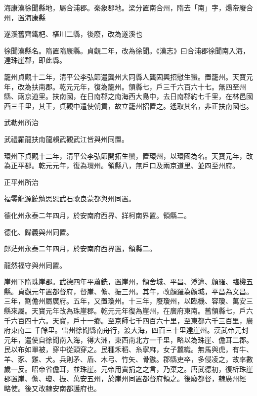 \begin{pinyinscope}
 海康漢徐聞縣地，屬合浦郡。秦象郡地。梁分置南合州，隋去「南」字，煬帝廢合州，置海康縣



 遂溪舊齊鐵杷、椹川二縣，後廢，改為遂溪也



 徐聞漢縣名。隋置隋康縣。貞觀二年，改為徐聞。《漢志》曰合浦郡徐聞南入海，達珠崖郡，即此縣。



 籠州貞觀十二年，清平公李弘節遣龔州大同縣人龔固興招慰生蠻。置籠州。天寶元年，改為扶南郡。乾元元年，復為籠州。領縣七，戶三千六百六十七。無四至州縣、兩京道里。扶南國，在日南郡之南海西大島中，去日南郡約七千里，在林邑國西三千里，其王，貞觀中遣使朝貢，故立籠州招置之。遙取其名，非正扶南國也。



 武勒州所治



 武禮羅龍扶南龍賴武觀武江皆與州同置。



 環州下貞觀十二年，清平公李弘節開拓生蠻，置環州，以環國為名。天寶元年，改為正平郡。乾元元年，復為環州。領縣八，無戶口及兩京道里、並四至州府。



 正平州所治



 福零龍源饒勉思恩武石歌良蒙都與州同置。



 德化州永泰二年四月，於安南府西界、牂柯南界置。領縣二。



 德化、歸義與州同置。



 郎茫州永泰二年四月，於安南府西界置，領縣二。



 龍然福守與州同置。



 崖州下隋珠崖郡。武德四年平蕭銑，置崖州，領舍城、平昌、澄邁、顏羅、臨機五縣。貞觀元年置都督府，督崖、儋、振三州。其年，改顏羅為顏城，平昌為文昌。三年，割儋州屬廣府。五年，又置瓊州。十三年，廢瓊州，以臨機、容瓊、萬安三縣來屬。天寶元年改為珠崖郡。乾元元年復為崖州，在廣府東南。舊領縣七，戶六千六百四十六。天寶，戶十一鄉。至京師七千四百六十里，至東都六千三百里，廣府東南二
 千餘里。雷州徐聞縣南舟行，渡大海，四百三十里達崖州。漢武帝元封元年，遣使自徐聞南入海，得大洲，東西南北方一千里，略以為珠崖、儋耳二郡。民以布如單被，穿中從頭穿之。民種禾稻、糸寧麻，女子蠶織。無馬與虎，有牛、羊、豕、雞、犬。兵則矛、盾、木弓、竹矢、骨鏃。郡縣吏卒，多侵凌之，故率數歲一反。昭帝省儋耳，並珠崖。元帝用賈捐之之言，乃棄之。唐武德初，復析珠崖郡置崖、儋、瓊、振、萬安五州，於崖州同置都督府領之。後廢都督，隸廣州經
 略使。後又改隸安南都護府也。




\end{pinyinscope}

